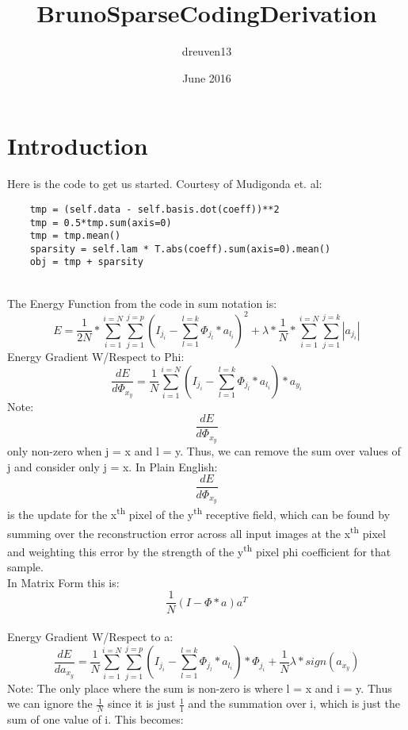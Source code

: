 \documentclass{article}
\title{BrunoSparseCodingDerivation}
\author{dreuven13 }
\date{June 2016}
\begin{document}
\maketitle

\section{Introduction}
Here is the code to get us started. Courtesy of Mudigonda et. al:
\begin{lstlisting}
    tmp = (self.data - self.basis.dot(coeff))**2
    tmp = 0.5*tmp.sum(axis=0)
    tmp = tmp.mean()
    sparsity = self.lam * T.abs(coeff).sum(axis=0).mean()
    obj = tmp + sparsity
\end{lstlisting}\\
\newcommand{\ErrorFunc}{\sum_{j=1}^{j=p}(I_j_i - \sum_{l=1}^{l=k}\Phi_j_l * a_l_i)}
\newcommand{\ErrFSinJ}{(I_j_i - \sum_{l=1}^{l=k}\Phi_j_l * a_l_i)}
The Energy Function from the code in sum notation is:
\begin{equation}
    E = \frac{1}{2N} *  \sum_{i=1}^{i=N}\ErrorFunc^2  + \lambda * \frac{1}{N} *  \sum_{i=1}^{i=N}\sum_{j=1}^{j=k}|a_j_i|
\end{equation}
Energy Gradient W/Respect to Phi: \\
\begin{equation}
    \frac{dE}{d\Phi_x_y} = \frac{1}{N}\sum_{i=1}^{i=N}\ErrFSinJ * a_y_i
\end{equation}
Note:  \[\frac{dE}{d\Phi_x_y}\] only non-zero when j = x and l = y. Thus, we can remove the sum over values of j and consider only j = x.
In Plain English:\\
\[\frac{dE}{d\Phi_x_y}\] is the update for the x\textsuperscript{th} pixel of the y\textsuperscript{th} receptive field, which can be found by summing over the reconstruction error across all input images at the x\textsuperscript{th} pixel and weighting this error by the strength of the y\textsuperscript{th} pixel phi coefficient for that sample.\\
In Matrix Form this is:
\begin{equation}
    \frac{1}{N}(I - \Phi * a)a^T
\end{equation}
\\
Energy Gradient W/Respect to a:
\begin{equation}
    \frac{dE}{da_x_y} = \frac{1}{N}\sum_{i=1}^{i=N}\ErrorFunc*\Phi_j_i + \frac{1}{N}\lambda * sign(a_x_y)
\end{equation}
Note: The only place where the sum is non-zero is where l = x and i = y. Thus we can ignore the $\frac{1}{N}$ since it is just $\frac{1}{1}$ and the summation over i, which is just the sum of one value of i. This becomes:
\end{document}
